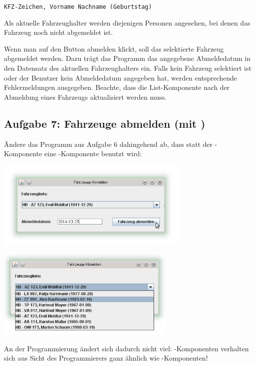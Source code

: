 \lstinline|KFZ-Zeichen, Vorname Nachname (Geburtstag)|

Als aktuelle Fahrzeughalter werden diejenigen Personen angesehen, bei denen das
Fahrzeug noch nicht abgemeldet ist. 

Wenn man auf den Button abmelden klickt, soll das selektierte Fahrzeug
abgemeldet werden. Dazu trägt das Programm das angegebene Abmeldedatum in den
Datensatz des aktuellen Fahrzeughalters ein. Falls kein Fahrzeug selektiert ist
oder der Benutzer kein Abmeldedatum angegeben hat, werden entsprechende
Fehlermeldungen ausgegeben. Beachte, dass die List-Komponente nach der
Abmeldung eines Fahrzeugs aktualisiert werden muss.


\subsection{Aufgabe 7: Fahrzeuge abmelden (mit )}

Ändere das Programm aus Aufgabe 6 dahingehend ab, dass statt der
-Komponente eine -Komponente benutzt wird:

\begin{center}
\includegraphics[width=0.7\textwidth]{./inf/SEKII/44_Abi-Training/FahrzeugeAbmeldenMitJComboBox1.png}
\end{center}

\begin{center}
\includegraphics[width=0.65\textwidth]{./inf/SEKII/44_Abi-Training/FahrzeugeAbmeldenMitJComboBox2.png}
\end{center}

An der Programmierung ändert sich dadurch nicht viel:
-Komponenten verhalten sich aus Sicht des Programmierers ganz
ähnlich wie -Komponenten!


